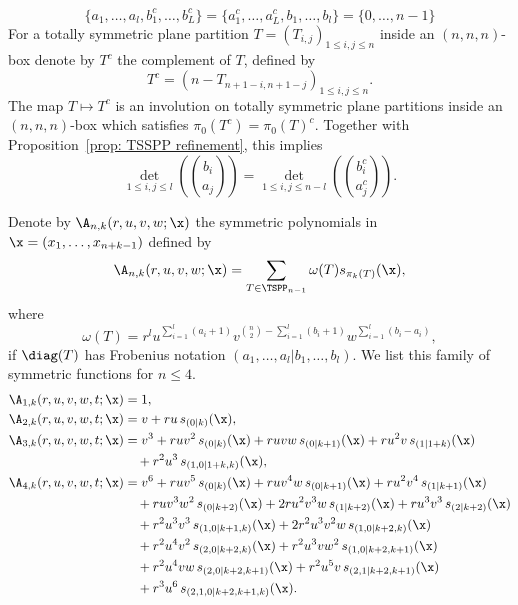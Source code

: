 \begin{equation}
\label{eq: Frobenius coef of complement}
\{a_1,\ldots,a_l, b_1^c,\ldots, b_L^c \}=\{ a_1^c,\ldots,a_L^c,b_1,\ldots,b_l\}=\{0,\ldots,n-1\}
\end{equation}
For a totally symmetric plane partition $T=(T_{i,j})_{1 \leq i,j \leq n}$ inside an $(n,n,n)$-box denote by $T^c$ the complement of $T$, defined by
\[
T^c = (n-T_{n+1-i,n+1-j})_{1 \leq i,j \leq n}.
\]
The map $T \mapsto T^c$ is an involution on  totally symmetric plane partitions inside an $(n,n,n)$-box which satisfies $\pi_0(T^c) = \pi_0(T)^c$. Together with Proposition~\ref{prop: TSSPP refinement}, this implies
\begin{equation}
\label{eq: det of complement}
\det_{1 \leq i,j \leq l}\left( \binom{b_i}{a_j}\right) =
\det_{1 \leq i,j \leq n-l}\left( \binom{b_i^c}{a_j^c}\right).
\end{equation} 

Denote by $\A_{n,k}(r, u,v,w;\x)$ the symmetric polynomials in $\x=(x_1,\ldots,x_{n+k-1})$ defined by
\begin{equation}
\label{eq: def of A}
\A_{n,k}(r, u,v,w;\x)=\sum_{T \in \TSPP_{n-1}}\omega(T) s_{\pi_k(T)}(\x),
\end{equation}
where 
\begin{equation} 
\label{eq: weightpp} 
\omega(T)=r^l u^{\sum\limits_{i=1}^l (a_i+1)}  v^{\binom{n}{2}-\sum\limits_{i=1}^l (b_i+1)} w^{\sum\limits_{i=1}^l (b_i-a_i)},
\end{equation} 
if $\diag(T)$ has Frobenius notation $(a_1,\ldots,a_l|b_1,\ldots,b_l)$. We list this family of symmetric functions for $n\leq 4$.
\begin{align*}
\A_{1,k} (r, u,v,w,t;\x) &=1, \\
\A_{2,k} (r, u,v,w,t;\x) &= v + r u \,s_{(0|k)}(\x), \\
\A_{3,k} (r, u,v,w,t;\x) &=  v^3 + r  u v^2  \, s_{(0|k)}(\x) + 
	r  u v w  \,s_{(0|k+1)}(\x)+ r   u^2 v \,s_{(1|1+k)}(\x) \\
	& \quad +r^2 u^3 \,s_{(1,0|1+k,k)}(\x), \\ 
\A_{4,k} (r, u,v,w,t;\x) &=   v^6
	+r  u v^5  \,s_{(0|k)}(\x)
	+r  u v^4 w \,s_{(0|k+1)}(\x)
	+r  u^2 v^4 \,s_{(1|k+1)}(\x) \\
	& \quad 	+r  u v^3 w^2 \,s_{(0|k+2)}(\x) 
	+2r  u^2 v^3 w \,s_{(1|k+2)}(\x) 
	+r  u^3 v^3 \,s_{(2|k+2)}(\x)  \\
	& \quad 	+r^2  u^3 v^3 \,s_{(1,0|k+1,k)}(\x)
	+2r^2  u^3 v^2 w  \,s_{(1,0|k+2,k)}(\x) \\
	& \quad 	+r^2  u^4 v^2 \,s_{(2,0|k+2,k)}(\x)  
	 +r^2  u^3 v w^2 \,s_{(1,0|k+2,k+1)}(\x) \\
	& \quad+r^2  u^4 v w \,s_{(2,0|k+2,k+1)}(\x) 
	+r^2  u^5 v \,s_{(2,1|k+2,k+1)}(\x) \\
	 & \quad 	+r^3 u^6 \,s_{(2,1,0|k+2,k+1,k)}(\x).
\end{align*}

